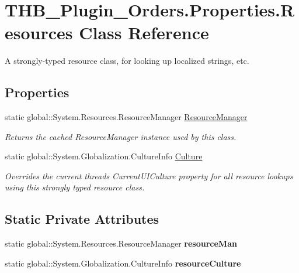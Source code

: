 \hypertarget{class_t_h_b___plugin___orders_1_1_properties_1_1_resources}{}\section{T\+H\+B\+\_\+\+Plugin\+\_\+\+Orders.\+Properties.\+Resources Class Reference}
\label{class_t_h_b___plugin___orders_1_1_properties_1_1_resources}


A strongly-\/typed resource class, for looking up localized strings, etc.  


\subsection*{Properties}
\begin{DoxyCompactItemize}
\item 
static global\+::\+System.\+Resources.\+Resource\+Manager \mbox{\hyperlink{class_t_h_b___plugin___orders_1_1_properties_1_1_resources_af9431eab17864a9aff07751c973e07b4}{Resource\+Manager}}
\begin{DoxyCompactList}\small\item\em Returns the cached Resource\+Manager instance used by this class. \end{DoxyCompactList}\item 
static global\+::\+System.\+Globalization.\+Culture\+Info \mbox{\hyperlink{class_t_h_b___plugin___orders_1_1_properties_1_1_resources_abc067a0bcc5bdc35ac68752a464d42cc}{Culture}}
\begin{DoxyCompactList}\small\item\em Overrides the current thread\textquotesingle{}s Current\+U\+I\+Culture property for all resource lookups using this strongly typed resource class. \end{DoxyCompactList}\end{DoxyCompactItemize}
\subsection*{Static Private Attributes}
\begin{DoxyCompactItemize}
\item 
\mbox{\label{class_t_h_b___plugin___orders_1_1_properties_1_1_resources_a55f529fe90663a657c5b13d890aa9940}} 
static global\+::\+System.\+Resources.\+Resource\+Manager {\bfseries resource\+Man}
\item 
\mbox{\label{class_t_h_b___plugin___orders_1_1_properties_1_1_resources_a92e2dbc2c2b32065ca3b5196eeb94e3c}} 
static global\+::\+System.\+Globalization.\+Culture\+Info {\bfseries resource\+Culture}
\end{DoxyCompactItemize}


